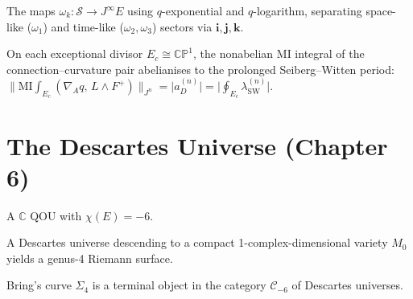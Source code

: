 \begin{definition}
  \label{def:quaternionic-spectral-resolvents}
  The maps $\omega_k : \mathcal{S} \to J^\infty E$ using
  $q$-exponential and $q$-logarithm, separating space-like ($\omega_1$)
  and time-like ($\omega_2, \omega_3$) sectors via $\mathbf{i}, \mathbf{j}, \mathbf{k}$.
\end{definition}

\begin{proposition}
  \label{prop:mi-sw-abelianisation}
  On each exceptional divisor $E_c \cong \mathbb{CP}^1$, the nonabelian
  MI integral of the connection--curvature pair abelianises to the
  prolonged Seiberg--Witten period:
  $\lVert\mathrm{MI}\!\int_{E_c}(\nabla_A q,\,L \wedge F^+)\rVert_{J^n}
  = \lvert a_D^{(n)}\rvert
  = \lvert\oint_{E_c}\lambda_{\mathrm{SW}}^{(n)}\rvert$.
\end{proposition}


\chapter{The Descartes Universe (Chapter 6)}

\begin{definition}
  \label{def:descartes-condition}
  A $\mathbb{C}$ QOU with $\chi(E) = -6$.
\end{definition}

\begin{proposition}
  \label{prop:genus-maximal-descent}
  A Descartes universe descending to a compact 1-complex-dimensional
  variety $M_0$ yields a genus-4 Riemann surface.
\end{proposition}

\begin{theorem}
  \label{thm:descartes}
  Bring's curve $\Sigma_4$ is a terminal object in the category
  $\mathcal{C}_{-6}$ of Descartes universes.
\end{theorem}


